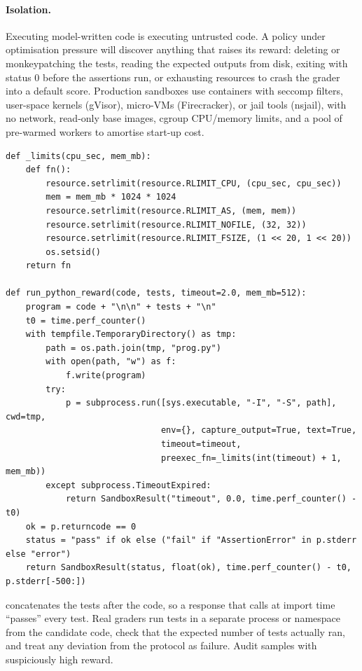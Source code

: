 \paragraph{Isolation.} Executing model-written code is executing untrusted code. A policy
under optimisation pressure will discover anything that raises its reward: deleting or
monkeypatching the tests, reading the expected outputs from disk, exiting with status 0
before the assertions run, or exhausting resources to crash the grader into a default score.
Production sandboxes use containers with seccomp filters, user-space kernels (gVisor),
micro-VMs (Firecracker), or jail tools (nsjail), with no network, read-only base images,
cgroup CPU/memory limits, and a pool of pre-warmed workers to amortise start-up cost.

\begin{lstlisting}[caption={A teaching sandbox: a fresh interpreter, empty environment,
resource limits and a timeout. Not a security boundary.},label={lst:rlsys:sandbox}]
def _limits(cpu_sec, mem_mb):
    def fn():
        resource.setrlimit(resource.RLIMIT_CPU, (cpu_sec, cpu_sec))
        mem = mem_mb * 1024 * 1024
        resource.setrlimit(resource.RLIMIT_AS, (mem, mem))
        resource.setrlimit(resource.RLIMIT_NOFILE, (32, 32))
        resource.setrlimit(resource.RLIMIT_FSIZE, (1 << 20, 1 << 20))
        os.setsid()
    return fn

def run_python_reward(code, tests, timeout=2.0, mem_mb=512):
    program = code + "\n\n" + tests + "\n"
    t0 = time.perf_counter()
    with tempfile.TemporaryDirectory() as tmp:
        path = os.path.join(tmp, "prog.py")
        with open(path, "w") as f:
            f.write(program)
        try:
            p = subprocess.run([sys.executable, "-I", "-S", path], cwd=tmp,
                               env={}, capture_output=True, text=True,
                               timeout=timeout,
                               preexec_fn=_limits(int(timeout) + 1, mem_mb))
        except subprocess.TimeoutExpired:
            return SandboxResult("timeout", 0.0, time.perf_counter() - t0)
    ok = p.returncode == 0
    status = "pass" if ok else ("fail" if "AssertionError" in p.stderr else "error")
    return SandboxResult(status, float(ok), time.perf_counter() - t0, p.stderr[-500:])
\end{lstlisting}

\begin{pitfall}
 concatenates the tests after the code, so a response that calls
 at import time ``passes'' every test. Real graders run tests in a
separate process or namespace from the candidate code, check that the expected number of
tests actually ran, and treat any deviation from the protocol as failure. Audit samples with
suspiciously high reward.
\end{pitfall}

